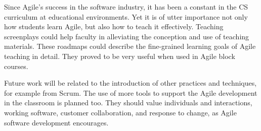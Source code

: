 \documentclass[conference]{IEEEtran}
\begin{document}
Since Agile's success in the software industry, it has been a constant in the CS curriculum at educational environments. Yet it is of utter importance not only how students learn Agile, but also how to teach it effectively. Teaching screenplays could help faculty in alleviating the conception and use of teaching materials. These roadmaps could describe the fine-grained learning goals of Agile teaching in detail. They proved to be very useful when used in Agile block courses.

Future work will be related to the introduction of other practices and techniques, for example from Scrum. The use of more tools to support the Agile development in the classroom is planned too. They should value individuals and interactions, working software, customer collaboration, and response to change, as Agile software development encourages.




\end{document}
